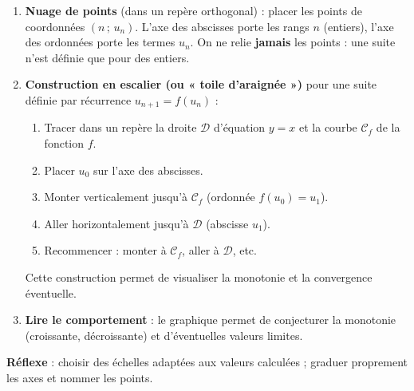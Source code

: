 \documentclass[11pt]{article}
\newcommand{\cle}[1]{{\popxbold\color{popdark}#1}}
\begin{document}
\begin{methode}
\begin{enumerate}
\item \textbf{Nuage de points} (dans un repère orthogonal) : placer les points de coordonnées $(n\,;\,u_n)$. L'axe des abscisses porte les \cle{rangs} $n$ (entiers), l'axe des ordonnées porte les \cle{termes} $u_n$. On ne relie \textbf{jamais} les points : une suite n'est définie que pour des entiers.
\item \textbf{Construction en escalier (ou « toile d'araignée »)} pour une suite définie par récurrence $u_{n+1}=f(u_n)$ :
\begin{enumerate}
\item Tracer dans un repère la droite $\mathcal{D}$ d'équation $y=x$ et la courbe $\mathcal{C}_f$ de la fonction $f$.
\item Placer $u_0$ sur l'axe des abscisses.
\item Monter verticalement jusqu'à $\mathcal{C}_f$ (ordonnée $f(u_0)=u_1$).
\item Aller horizontalement jusqu'à $\mathcal{D}$ (abscisse $u_1$).
\item Recommencer : monter à $\mathcal{C}_f$, aller à $\mathcal{D}$, etc.
\end{enumerate}
Cette construction permet de visualiser la monotonie et la convergence éventuelle.
\item \textbf{Lire le comportement} : le graphique permet de conjecturer la monotonie (croissante, décroissante) et d'éventuelles valeurs limites.
\end{enumerate}
\textbf{Réflexe} : choisir des échelles adaptées aux valeurs calculées ; graduer proprement les axes et nommer les points.
\end{methode}
\end{document}
